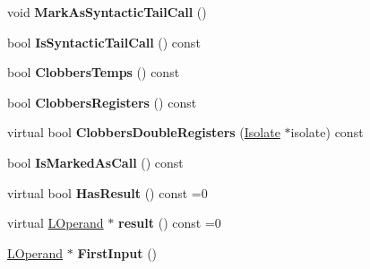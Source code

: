 \begin{DoxyCompactItemize}
\item 
void {\bfseries Mark\+As\+Syntactic\+Tail\+Call} ()\hypertarget{classv8_1_1internal_1_1_l_instruction_a72c62906028bed230decd2719d08a847}{}\label{classv8_1_1internal_1_1_l_instruction_a72c62906028bed230decd2719d08a847}

\item 
bool {\bfseries Is\+Syntactic\+Tail\+Call} () const \hypertarget{classv8_1_1internal_1_1_l_instruction_a2f5419706e2dbe5ab9cc774e3c2816c0}{}\label{classv8_1_1internal_1_1_l_instruction_a2f5419706e2dbe5ab9cc774e3c2816c0}

\item 
bool {\bfseries Clobbers\+Temps} () const \hypertarget{classv8_1_1internal_1_1_l_instruction_ae0d7f1fe3d3d67357050ddb2cd539d62}{}\label{classv8_1_1internal_1_1_l_instruction_ae0d7f1fe3d3d67357050ddb2cd539d62}

\item 
bool {\bfseries Clobbers\+Registers} () const \hypertarget{classv8_1_1internal_1_1_l_instruction_a1be40eb2a9feb7da6047a05f41e6fb5c}{}\label{classv8_1_1internal_1_1_l_instruction_a1be40eb2a9feb7da6047a05f41e6fb5c}

\item 
virtual bool {\bfseries Clobbers\+Double\+Registers} (\hyperlink{classv8_1_1internal_1_1_isolate}{Isolate} $\ast$isolate) const \hypertarget{classv8_1_1internal_1_1_l_instruction_acbdd958e836acbc67e53ae3de2b17149}{}\label{classv8_1_1internal_1_1_l_instruction_acbdd958e836acbc67e53ae3de2b17149}

\item 
bool {\bfseries Is\+Marked\+As\+Call} () const \hypertarget{classv8_1_1internal_1_1_l_instruction_afb5aff9204835a6dcec75538e3da4b2f}{}\label{classv8_1_1internal_1_1_l_instruction_afb5aff9204835a6dcec75538e3da4b2f}

\item 
virtual bool {\bfseries Has\+Result} () const  =0\hypertarget{classv8_1_1internal_1_1_l_instruction_af38ca7b40171f2ed75a2970ac7e15fd8}{}\label{classv8_1_1internal_1_1_l_instruction_af38ca7b40171f2ed75a2970ac7e15fd8}

\item 
virtual \hyperlink{classv8_1_1internal_1_1_l_operand}{L\+Operand} $\ast$ {\bfseries result} () const  =0\hypertarget{classv8_1_1internal_1_1_l_instruction_a3c5b856bb92c72dabcf08086abf6f8d7}{}\label{classv8_1_1internal_1_1_l_instruction_a3c5b856bb92c72dabcf08086abf6f8d7}

\item 
\hyperlink{classv8_1_1internal_1_1_l_operand}{L\+Operand} $\ast$ {\bfseries First\+Input} ()\hypertarget{classv8_1_1internal_1_1_l_instruction_ad9675d1c06250b28199f105835b80329}{}\label{classv8_1_1internal_1_1_l_instruction_ad9675d1c06250b28199f105835b80329}


\end{DoxyCompactItemize}
